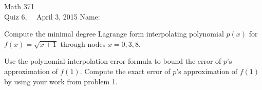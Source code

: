 \documentclass[addpoints, 11pt]{exam}
\begin{document}
Math 371 \\
Quiz 6, \ \ April 3, 2015
\hspace{2.in}
{Name:} {\underline {\hspace{2.15in}}} \\ \normalsize
\begin{questions}

\question Compute the minimal degree Lagrange form interpolating polynomial $p(x)$ for $f(x)=\sqrt{x+1}$ through nodes $x=0, 3, 8$. 
\vfill

\question Use the polynomial interpolation error formula to bound the error of $p$'s approximation of $f(1)$. Compute the exact error of $p$'s approximation of $f(1)$ by using your work from problem 1. 
\vfill

\end{questions}
\end{document}
